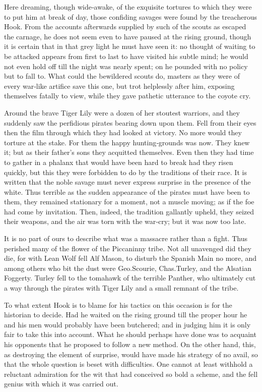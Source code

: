 Here dreaming, though wide‐awake, of the exquisite tortures to which they were to put him at break of day,
those confiding savages were found by the treacherous Hook.
From the accounts afterwards supplied by such of the scouts as escaped the carnage,
he does not seem even to have paused at the rising ground,
though it is certain that in that grey light he must have seen it:
no thought of waiting to be attacked appears from first to last to have visited his subtle mind;
he would not even hold off till the night was nearly spent;
on he pounded with no policy but to fall to.
What could the bewildered scouts do, masters as they were of every war‐like artifice save this one,
but trot helplessly after him, exposing themselves fatally to view,
while they gave pathetic utterance to the coyote cry.

Around the brave Tiger Lily were a dozen of her stoutest warriors,
and they suddenly saw the perfidious pirates bearing down upon them.
Fell from their eyes then the film through which they had looked at victory.
No more would they torture at the stake.
For them the happy hunting‐grounds was now.
They knew it;
but as their father’s sons they acquitted themselves.
Even then they had time to gather in a phalanx that would have been hard to break had they risen quickly,
but this they were forbidden to do by the traditions of their race.
It is written that the noble savage must never express surprise in the presence of the white.
Thus terrible as the sudden appearance of the pirates must have been to them,
they remained stationary for a moment, not a muscle moving;
as if the foe had come by invitation.
Then, indeed, the tradition gallantly upheld, they seized their weapons,
and the air was torn with the war‐cry;
but it was now too late.

It is no part of ours to describe what was a massacre rather than a fight.
Thus perished many of the flower of the Piccaninny tribe.
Not all unavenged did they die,
for with Lean Wolf fell Alf Mason, to disturb the Spanish Main no more,
and among others who bit the dust were Geo.\@ Scourie, Chas.\@ Turley, and the Alsatian Foggerty.
Turley fell to the tomahawk of the terrible Panther,
who ultimately cut a way through the pirates with Tiger Lily and a small remnant of the tribe.

To what extent Hook is to blame for his tactics on this occasion is for the historian to decide.
Had he waited on the rising ground till the proper hour he and his men would probably have been butchered;
and in judging him it is only fair to take this into account.
What he should perhaps have done was to acquaint his opponents that he proposed to follow a new method.
On the other hand, this, as destroying the element of surprise, would have made his strategy of no avail,
so that the whole question is beset with difficulties.
One cannot at least withhold a reluctant admiration for the wit that had conceived so bold a scheme,
and the fell genius with which it was carried out.

